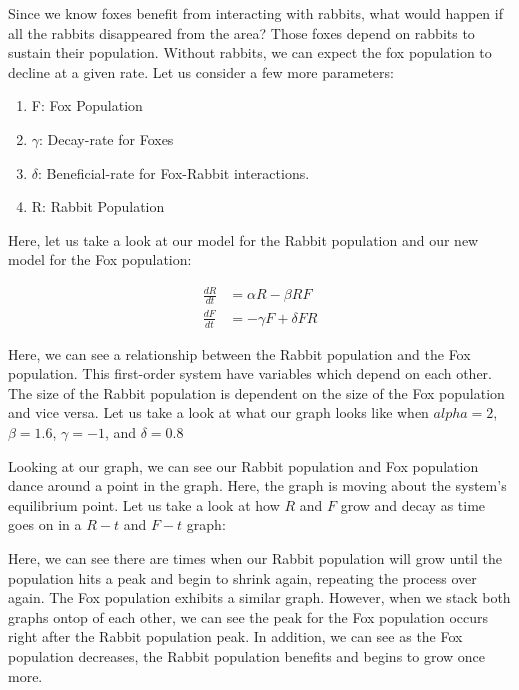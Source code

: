 \documentclass{amsart}
\theoremstyle{definition}
\numberwithin{equation}{section}
\begin{document}
\begin{sansmath}
Since we know foxes benefit from interacting with rabbits, what would happen if all the rabbits disappeared from the area? Those foxes depend on rabbits to sustain their population. Without rabbits, we can expect the fox population to decline at a given rate. Let us consider a few more parameters:

\begin{enumerate}
  \item F: Fox Population
  \item $\gamma$: Decay-rate for Foxes
  \item $\delta$: Beneficial-rate for Fox-Rabbit interactions.
  \item R: Rabbit Population
\end{enumerate}

Here, let us take a look at our model for the Rabbit population and our new model for the Fox population:

\begin{align}
  \frac{dR}{dt} & = \alpha R - \beta RF\\
  \frac{dF}{dt} & = -\gamma F + \delta FR
\end{align}

Here, we can see a relationship between the Rabbit population and the Fox population. This first-order system have variables which depend on each other. The size of the Rabbit population is dependent on the size of the Fox population and vice versa.
Let us take a look at what our graph looks like when $alpha = 2$, $\beta = 1.6$, $\gamma = -1$, and $\delta = 0.8$


Looking at our graph, we can see our Rabbit population and Fox population dance around a point in the graph. Here, the graph is moving about the system's equilibrium point. Let us take a look at how $R$ and $F$ grow and decay as time goes on in a $R-t$ and $F-t$ graph:


Here, we can see there are times when our Rabbit population will grow until the population hits a peak and begin to shrink again, repeating the process over again. The Fox population exhibits a similar graph. However, when we stack both graphs ontop of each other, we can see the peak for the Fox population occurs right after the Rabbit population peak. In addition, we can see as the Fox population decreases, the Rabbit population benefits and begins to grow once more.



\end{sansmath}
\end{document}
